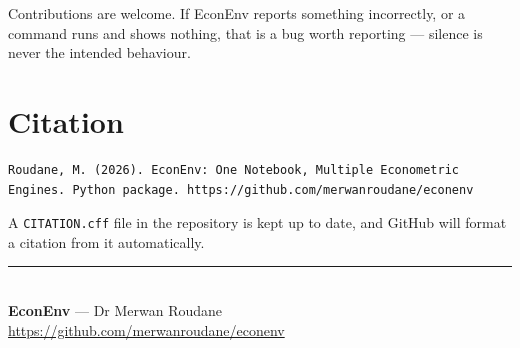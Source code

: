 \documentclass[11pt,a4paper]{report}
\begin{document}
Contributions are welcome. If EconEnv reports something incorrectly, or a
command runs and shows nothing, that is a bug worth reporting --- silence is
never the intended behaviour.

\section{Citation}

\begin{lstlisting}
Roudane, M. (2026). EconEnv: One Notebook, Multiple Econometric
Engines. Python package. https://github.com/merwanroudane/econenv
\end{lstlisting}

A \texttt{CITATION.cff} file in the repository is kept up to date, and GitHub
will format a citation from it automatically.

\vfill
\begin{center}
\rule{0.4\textwidth}{0.4pt}\\[8pt]
\textbf{EconEnv} --- Dr Merwan Roudane\\
\url{https://github.com/merwanroudane/econenv}
\end{center}
\end{document}
